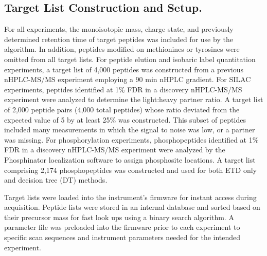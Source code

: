 \subsection{Target List Construction and \inseq{} Setup.}
For all experiments, the monoisotopic mass, charge state, and previously determined retention time of target peptides was included for use by the \inseq{} algorithm. In addition, peptides modified on methionines or tyrosines were omitted from all target lists. For peptide elution and isobaric label quantitation \inseq{} experiments, a target list of 4,000 peptides was constructed from a previous nHPLC-MS/MS experiment employing a 90 min nHPLC gradient. For SILAC \inseq{} experiments, peptides identified at 1\% FDR in a discovery nHPLC-MS/MS experiment were analyzed to determine the light:heavy partner ratio. A target list of 2,000 peptide pairs (4,000 total peptides) whose ratio deviated from the expected value of 5 by at least 25\% was constructed. This subset of peptides included many measurements in which the signal to noise was low, or a partner was missing. For phosphorylation \inseq{} experiments, phosphopeptides identified at 1\% FDR in a discovery nHPLC-MS/MS experiment were analyzed by the Phosphinator localization software to assign phosphosite locations. A target list comprising 2,174 phosphopeptides was constructed and used for both ETD only and decision tree (DT) \inseq{} methods.

Target lists were loaded into the instrument's firmware for instant access during acquisition. Peptide lists were stored in an internal database and sorted based on their precursor mass for fast look ups using a binary search algorithm. A parameter file was preloaded into the firmware prior to each experiment to specific scan sequences and instrument parameters needed for the intended experiment.

